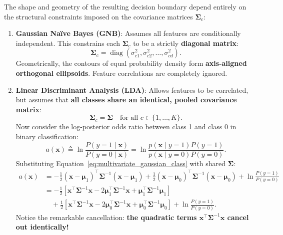 The shape and geometry of the resulting decision boundary depend entirely on the structural constraints imposed on the covariance matrices $\boldsymbol{\Sigma}_c$:
\begin{enumerate}
  \item \textbf{Gaussian Naïve Bayes (GNB)}:
  Assumes all features are conditionally independent. This constrains each $\boldsymbol{\Sigma}_c$ to be a strictly \textbf{diagonal matrix}:
  \begin{equation}
  \boldsymbol{\Sigma}_c = \operatorname{diag}(\sigma_{c1}^2, \sigma_{c2}^2, \dots, \sigma_{cd}^2).
  \end{equation}
  Geometrically, the contours of equal probability density form \textbf{axis-aligned orthogonal ellipsoids}. Feature correlations are completely ignored.

  \item \textbf{Linear Discriminant Analysis (LDA)}:
  Allows features to be correlated, but assumes that \textbf{all classes share an identical, pooled covariance matrix}:
  \begin{equation}
  \boldsymbol{\Sigma}_c = \boldsymbol{\Sigma} \quad \text{for all } c \in \{1, \dots, K\}.
  \end{equation}
  Now consider the log-posterior odds ratio between class 1 and class 0 in binary classification:
  \begin{equation}
  a(\mathbf{x}) \triangleq \ln \frac{P(y = 1 \mid \mathbf{x})}{P(y = 0 \mid \mathbf{x})} = \ln \frac{p(\mathbf{x} \mid y = 1) P(y = 1)}{p(\mathbf{x} \mid y = 0) P(y = 0)}.
  \end{equation}
  Substituting Equation~\eqref{eq:multivariate_gaussian_class} with shared $\boldsymbol{\Sigma}$:
  \begin{align}
  a(\mathbf{x}) &= -\frac{1}{2}(\mathbf{x} - \boldsymbol{\mu}_1)^\top \boldsymbol{\Sigma}^{-1} (\mathbf{x} - \boldsymbol{\mu}_1) + \frac{1}{2}(\mathbf{x} - \boldsymbol{\mu}_0)^\top \boldsymbol{\Sigma}^{-1} (\mathbf{x} - \boldsymbol{\mu}_0) + \ln \frac{P(y = 1)}{P(y = 0)} \nonumber \\
  &= -\frac{1}{2}\left[ \mathbf{x}^\top \boldsymbol{\Sigma}^{-1}\mathbf{x} - 2\boldsymbol{\mu}_1^\top \boldsymbol{\Sigma}^{-1}\mathbf{x} + \boldsymbol{\mu}_1^\top \boldsymbol{\Sigma}^{-1}\boldsymbol{\mu}_1 \right] \nonumber \\
  &\quad + \frac{1}{2}\left[ \mathbf{x}^\top \boldsymbol{\Sigma}^{-1}\mathbf{x} - 2\boldsymbol{\mu}_0^\top \boldsymbol{\Sigma}^{-1}\mathbf{x} + \boldsymbol{\mu}_0^\top \boldsymbol{\Sigma}^{-1}\boldsymbol{\mu}_0 \right] + \ln \frac{P(y = 1)}{P(y = 0)}.
  \end{align}
  Notice the remarkable cancellation: \textbf{the quadratic terms $\mathbf{x}^\top \boldsymbol{\Sigma}^{-1}\mathbf{x}$ cancel out identically!}
  

\end{enumerate}
